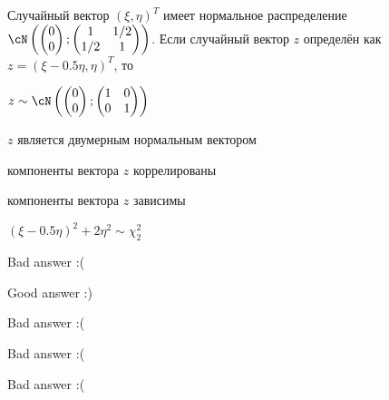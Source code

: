 
\begin{question}
Случайный вектор \((\xi, \eta)^T\) имеет нормальное распределение
\(\cN \left( \begin{pmatrix} 0 \\ 0 \end{pmatrix}; \begin{pmatrix} 1 & 1/2 \\ 1/2 & 1 \end{pmatrix} \right)\).
Если случайный вектор \(z\) определён как \(z=(\xi - 0.5\eta, \eta)^T\),
то
\begin{answerlist}
  \item \(z \sim \cN \left( \begin{pmatrix} 0 \\ 0 \end{pmatrix}; \begin{pmatrix} 1 & 0 \\ 0 & 1 \end{pmatrix} \right)\)
  \item \(z\) является двумерным нормальным вектором
  \item компоненты вектора \(z\) коррелированы
  \item компоненты вектора \(z\) зависимы
  \item \((\xi - 0.5\eta)^2 + 2\eta^2 \sim \chi_2^2\)
\end{answerlist}
\end{question}

\begin{solution}
\begin{answerlist}
  \item Bad answer :(
  \item Good answer :)
  \item Bad answer :(
  \item Bad answer :(
  \item Bad answer :(
\end{answerlist}
\end{solution}

